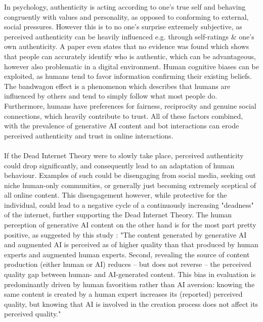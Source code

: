 \documentclass{article}
\begin{document}
In psychology, authenticity is acting according to one's true self and behaving congruently with values and personality, as opposed to conforming to external, social pressures. \cite{authenticity_psychology} However this is to no one's surprise extremely subjective, as perceived authenticity can be heavily influenced e.g. through self-ratings \& one's own authenticity. A paper \cite{are_you_for_real} even states that no evidence was found which shows that people can accurately identify who is authentic, which can be advantageous, however also problematic in a digital environment. Human cognitive biases can be exploited, as humans tend to favor information confirming their existing beliefs. The bandwagon effect is a phenomenon which describes that humans are influenced by others and tend to simply follow what most people do.
Furthermore, humans have preferences for fairness, reciprocity and genuine social connections, which heavily contribute to trust. All of these factors combined, with the prevalence of generative AI content and bot interactions can erode perceived authenticity and trust in online interactions. 
\\
\\
If the Dead Internet Theory were to slowly take place, perceived authenticity could drop significantly, and consequently lead to an adaptation of human behaviour. Examples of such could be disengaging from social media, seeking out niche human-only communities, or generally just becoming extremely sceptical of all online content. This disengagement however, while protective for the individual, could lead to a negative cycle of a continuously increasing "deadness" of the internet, further supporting the Dead Internet Theory.
The human perception of generative AI content on the other hand is for the most part pretty positive, as suggested by this study \cite{human_perception_of_ai} :
"The content generated by generative AI and augmented AI is perceived as of higher quality than that produced by human experts and augmented human experts. Second, revealing the source of content production (either human or AI) reduces – but does not reverse – the perceived quality gap between human- and AI-generated content. This bias in evaluation is predominantly driven by human favoritism rather than AI aversion: knowing the same content is created by a human expert increases its (reported) perceived quality, but knowing that AI is involved in the creation process does not affect its perceived quality."
\\
\end{document}
